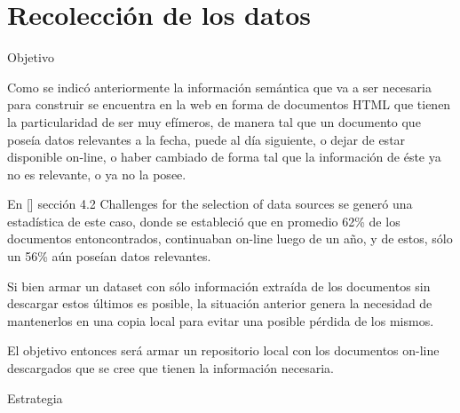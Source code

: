\chapter{Recolección de los datos}

 

Objetivo 

Como se indicó anteriormente la información semántica que va a ser necesaria para construir se encuentra en la web en forma de documentos 
HTML que tienen la particularidad de ser muy efímeros, de manera tal que un documento que poseía datos relevantes a la fecha,
puede al día siguiente, o dejar de estar disponible on-line, o haber cambiado de forma tal que la información de éste ya no es 
relevante, o ya no la posee. 

En [] sección 4.2 Challenges for the selection of data sources se generó una estadística de este caso, donde se estableció que 
en promedio 62\% de los documentos entoncontrados, continuaban on-line luego de un año, y de estos, sólo un 56\% aún poseían 
datos relevantes. 

Si bien armar un dataset con sólo información extraída de los documentos sin descargar estos últimos es posible, la situación anterior 
genera la necesidad de mantenerlos en una copia local para evitar una posible pérdida de los mismos. 

El objetivo entonces será armar un repositorio local con los documentos on-line descargados que se cree que tienen la información 
necesaria. 

 

Estrategia 




